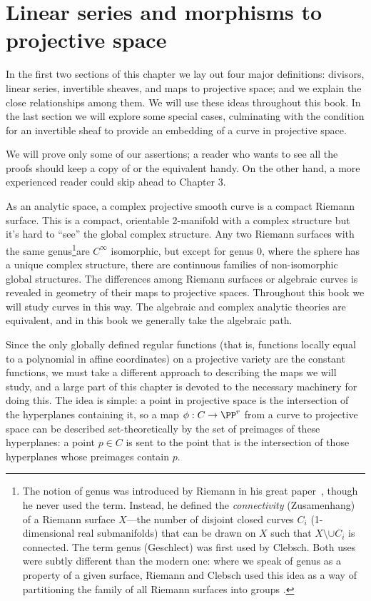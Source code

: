 

\chapter{Linear series and morphisms to projective space}\label{linear series}

In the first two sections of this chapter we lay out four major definitions:
divisors, linear series, invertible sheaves, and maps to projective space; and
we explain the close relationships among them. We will use these ideas throughout
this book. In the last section we will explore some special cases, culminating with
the condition for an invertible sheaf to provide an embedding of a curve in projective space.

We will prove only some of our assertions; a reader who wants to see all the proofs should keep a copy of \cite{Hartshorne1977} or the equivalent handy. On the other hand, a more experienced reader
could skip ahead to Chapter 3.

As an analytic space, a complex projective smooth curve is a compact Riemann surface. This is a compact, orientable 2-manifold with a complex structure but it's hard to ``see'' the global complex structure. Any two Riemann surfaces with the same genus\footnote{The notion of genus was introduced by Riemann in his great paper~\cite{Riemann}, though he never used the term. Instead,
he defined the \emph{connectivity} (Zusamenhang) of a Riemann surface $X$---the number of disjoint closed curves $C_i$ (1-dimensional real submanifolds) that can be drawn on $X$ such that $X\setminus \cup C_i$ is connected. The term genus (Geschlect) was first used by Clebsch. Both uses
were subtly different than the modern one: where we speak of genus as a property of a given surface, Riemann and Clebsch
used this idea as a way of partitioning the family of all Riemann surfaces into groups \cite{MR4175877}.}are $C^\infty$ isomorphic,
but except for genus 0, where the sphere has a unique complex structure,
there are continuous families of non-isomorphic global structures.  The differences among Riemann surfaces or algebraic curves is revealed in  geometry of their maps to projective spaces. Throughout this book we will study curves in this way. The algebraic and
complex analytic theories are equivalent, and in this book we generally take the algebraic path.

Since the only  globally defined regular functions (that is, functions locally equal to a polynomial in affine coordinates) on a projective variety are the constant functions, we must take a different approach to describing the maps we will study, and a large part of this chapter is devoted to the necessary machinery for doing this. The idea is simple: a point in projective space is the intersection of the hyperplanes containing it, so a map $\phi: C\to \PP^r$ from a curve to projective space can be described set-theoretically
by the set of preimages of these hyperplanes: a point $p\in C$ is sent to the point
that is the intersection of those hyperplanes whose preimages contain $p$.
 

